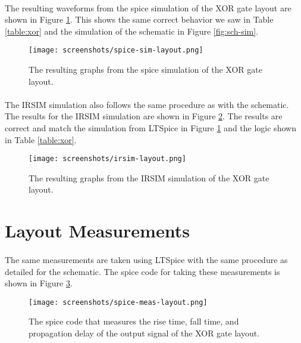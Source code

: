 \documentclass{article}
\begin{document}
  \paragraph{}
  The resulting waveforms from the spice simulation of the XOR gate layout are shown in Figure \ref{fig:spice-sim-lay}. This shows the same correct behavior we saw in Table \ref{table:xor} and the simulation of the schematic in Figure \ref{fig:sch-sim}.

  \begin{figure}[H]
    \centering
    \texttt{[image: screenshots/spice-sim-layout.png]}
    \caption{The resulting graphs from the spice simulation of the XOR gate layout.}
    \label{fig:spice-sim-lay}
  \end{figure}

  \paragraph{}
  The IRSIM simulation also follows the same procedure as with the schematic. The results for the IRSIM simulation are shown in Figure \ref{fig:irsim-lay}. The results are correct and match the simulation from LTSpice in Figure \ref{fig:spice-sim-lay} and the logic shown in Table \ref{table:xor}.



  \begin{figure}[H]
    \centering
    \texttt{[image: screenshots/irsim-layout.png]}
    \caption{The resulting graphs from the IRSIM simulation of the XOR gate layout.}
    \label{fig:irsim-lay}
  \end{figure}

\section{Layout Measurements}
  \paragraph{}
  The same measurements are taken using LTSpice with the same procedure as detailed for the schematic. The spice code for taking these measurements is shown in Figure \ref{fig:spice-meas-lay}.


  \begin{figure}[H]
    \centering
    \texttt{[image: screenshots/spice-meas-layout.png]}
    \caption{The spice code that measures the rise time, fall time, and propagation delay of the output signal of the XOR gate layout.}
    \label{fig:spice-meas-lay}
  \end{figure}
\end{document}
